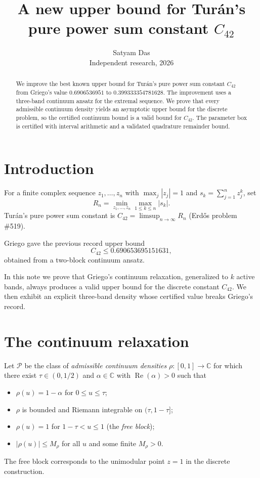 \documentclass[11pt]{article}
\title{A new upper bound for Tur\'{a}n's pure power sum constant $C_{42}$}
\author{Satyam Das\\
\small Independent research, 2026}
\date{}
\theoremstyle{plain}
\DeclareMathOperator{\Repart}{Re}
\begin{document}
\maketitle

\begin{abstract}
We improve the best known upper bound for Tur\'{a}n's pure power sum constant $C_{42}$ from Griego's value $0.6906536951$ to $0.399333354781628$.  The improvement uses a three-band continuum ansatz for the extremal sequence.  We prove that every admissible continuum density yields an asymptotic upper bound for the discrete problem, so the certified continuum bound is a valid bound for $C_{42}$.  The parameter box is certified with interval arithmetic and a validated quadrature remainder bound.
\end{abstract}

\section{Introduction}

For a finite complex sequence $z_1,\dots,z_n$ with $\max_j |z_j|=1$ and $s_k = \sum_{j=1}^n z_j^k$, set
\[
R_n = \min_{z_1,\dots,z_n} \max_{1\le k\le n} |s_k|.
\]
Tur\'{a}n's pure power sum constant is $C_{42}=\limsup_{n\to\infty} R_n$ (Erd\H{o}s problem \#519).

Griego \cite{griego} gave the previous record upper bound
\[
C_{42} \le 0.690653695151631,
\]
obtained from a two-block continuum ansatz.

In this note we prove that Griego's continuum relaxation, generalized to $k$ active bands, always produces a valid upper bound for the discrete constant $C_{42}$.  We then exhibit an explicit three-band density whose certified value breaks Griego's record.

\section{The continuum relaxation}

Let $\mathcal P$ be the class of \emph{admissible continuum densities} $\rho:[0,1]\to\mathbb C$ for which there exist $\tau\in(0,1/2)$ and $\alpha\in\mathbb C$ with $\Repart(\alpha)>0$ such that
\begin{itemize}
\item $\rho(u)=1-\alpha$ for $0\le u\le\tau$;
\item $\rho$ is bounded and Riemann integrable on $(\tau,1-\tau]$;
\item $\rho(u)=1$ for $1-\tau<u\le1$ (the \emph{free block});
\item $|\rho(u)|\le M_\rho$ for all $u$ and some finite $M_\rho>0$.
\end{itemize}
The free block corresponds to the unimodular point $z=1$ in the discrete construction.
\end{document}
